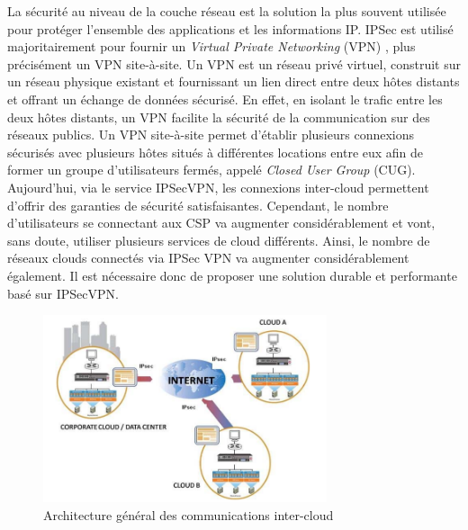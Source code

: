 La sécurité au niveau de la couche réseau est la solution la plus souvent utilisée pour protéger l'ensemble des applications et les informations IP. IPSec est utilisé majoritairement pour fournir un \textit{Virtual Private Networking} (VPN) \cite{ipsec_vpn}, plus précisément un VPN site-à-site. Un VPN est un réseau privé virtuel, construit sur un réseau physique existant et fournissant un lien direct entre deux hôtes distants et offrant un échange de données sécurisé. En effet, en isolant le trafic entre les deux hôtes distants, un VPN facilite la sécurité de la communication  sur des réseaux publics. Un VPN site-à-site permet d'établir plusieurs connexions sécurisés avec plusieurs hôtes situés à différentes locations entre eux afin de former un groupe d'utilisateurs fermés, appelé \textit{Closed User Group} (CUG). Aujourd'hui, via le service IPSecVPN, les connexions inter-cloud permettent d'offrir des garanties de sécurité satisfaisantes. Cependant, le nombre d'utilisateurs se connectant aux CSP va augmenter considérablement et vont, sans doute, utiliser plusieurs services de cloud différents. Ainsi, le nombre de réseaux clouds connectés via IPSec VPN va augmenter considérablement également. Il est nécessaire donc de proposer une solution durable et performante basé sur IPSecVPN.

\begin{figure}[h]
	\center
	\includegraphics[height=5.5cm]{./pics/inter_cloud_archi_general.png}
	\caption{Architecture général des communications inter-cloud \cite{archi_inter}}
	\label{label-image3}
\end{figure}

